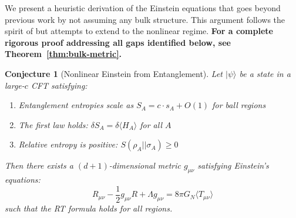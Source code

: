 \documentclass[12pt,a4paper]{article}
\newtheorem{conjecture}[theorem]{Conjecture}
\begin{document}
We present a heuristic derivation of the Einstein equations that goes beyond previous work by not assuming any bulk structure. This argument follows the spirit of \cite{faulkner2014,lashkari2014} but attempts to extend to the nonlinear regime. \textbf{For a complete rigorous proof addressing all gaps identified below, see Theorem~\ref{thm:bulk-metric}.}

\begin{conjecture}[Nonlinear Einstein from Entanglement]
Let $|\psi\rangle$ be a state in a large-$c$ CFT satisfying:
\begin{enumerate}
    \item Entanglement entropies scale as $S_A = c \cdot s_A + O(1)$ for ball regions
    \item The first law holds: $\delta S_A = \delta \langle H_A \rangle$ for all $A$
    \item Relative entropy is positive: $S(\rho_A || \sigma_A) \geq 0$
\end{enumerate}
Then there exists a $(d+1)$-dimensional metric $g_{\mu\nu}$ satisfying Einstein's equations:
\begin{equation}
R_{\mu\nu} - \frac{1}{2}g_{\mu\nu}R + \Lambda g_{\mu\nu} = 8\pi G_N \langle T_{\mu\nu} \rangle
\end{equation}
such that the RT formula holds for all regions.
\end{conjecture}
\end{document}
